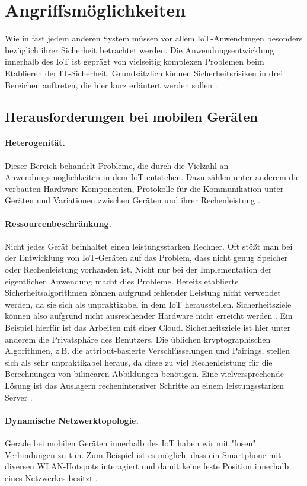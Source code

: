 \section{Angriffsmöglichkeiten}
Wie in fast jedem anderen System müssen vor allem IoT-Anwendungen besonders
bezüglich ihrer Sicherheit betrachtet werden. Die Anwendungsentwicklung
innerhalb des IoT ist geprägt von vielseitig komplexen Problemen beim Etablieren
der IT-Sicherheit. Grundsätzlich können Sicherheitsrisiken in drei Bereichen
auftreten, die hier kurz erläutert werden sollen \cite{paper}.

\subsection{Herausforderungen bei mobilen Geräten}
\paragraph{Heterogenität.}
Dieser Bereich behandelt Probleme, die durch die Vielzahl an
Anwendungsmöglichkeiten in dem IoT entstehen. Dazu zählen unter anderem
die verbauten Hardware-Komponenten, Protokolle für die Kommunikation unter
Geräten und Variationen zwischen Geräten und ihrer Rechenleistung \cite{paper}.

\paragraph{Ressourcenbeschränkung.}
Nicht jedes Gerät beinhaltet einen leistungsstarken Rechner. Oft stößt man bei
der Entwicklung von IoT-Geräten auf das Problem, dass nicht genug Speicher oder
Rechenleistung vorhanden ist. Nicht nur bei der Implementation der eigentlichen
Anwendung macht dies Probleme. Bereits etablierte Sicherheitsalgorithmen können
aufgrund fehlender Leistung nicht verwendet werden, da sie sich als
unpraktikabel in dem IoT herausstellen. Sicherheitsziele können also aufgrund
nicht ausreichender Hardware nicht erreicht werden \cite{paper}. Ein Beispiel
hierfür ist das Arbeiten mit einer Cloud. Sicherheitsziele ist hier unter
anderem die Privatsphäre des Benutzers. Die üblichen kryptographischen
Algorithmen, z.B. die attribut-basierte Verschlüsselungen und Pairings, stellen
sich als sehr unpraktikabel heraus, da diese zu viel Rechenleistung für die
Berechnungen von bilinearen Abbildungen benötigen. Eine vielversprechende Lösung
ist das Auslagern rechenintensiver Schritte an einem leistungsstarken Server
\cite{phoabe}.

\paragraph{Dynamische Netzwerktopologie.}
Gerade bei mobilen Geräten innerhalb des IoT haben wir mit "losen" Verbindungen
zu tun. Zum Beispiel ist es möglich, dass ein Smartphone mit diversen
WLAN-Hotspots interagiert und damit keine feste Position innerhalb eines
Netzwerkes besitzt \cite{paper}.

